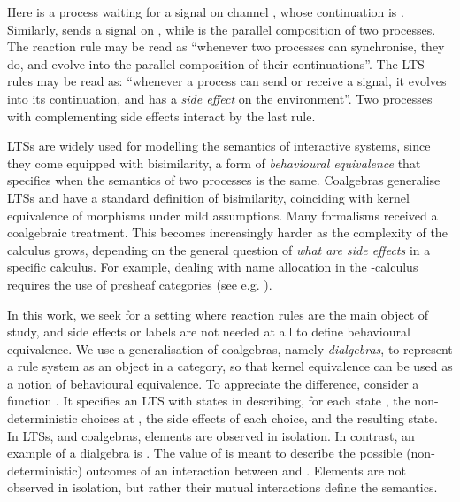 \documentclass[orivec]{llncs}
\begin{document}
Here  is a process waiting for a signal on channel , whose continuation is . Similarly,  sends a signal on , while  is the parallel composition of two processes. The reaction rule may be read as ``whenever two processes can synchronise, they do, and evolve into the parallel composition of their continuations''. The LTS rules may be read as: ``whenever a process can send or receive a signal, it evolves into its continuation, and has a \emph{side effect} on the environment''. Two processes with complementing side effects interact by the last rule. 



LTSs are widely used for modelling the semantics of interactive systems, since they come equipped with bisimilarity, a form of \emph{behavioural equivalence} that specifies when the semantics of two processes is the same. Coalgebras generalise LTSs and have a standard definition of bisimilarity, coinciding with kernel equivalence of morphisms under mild assumptions. Many formalisms received a coalgebraic treatment. This becomes increasingly harder as the complexity of the calculus grows, depending on the general question of \emph{what are side effects} in a specific calculus. For example, dealing with name allocation in the -calculus requires the use of presheaf categories (see e.g. \cite{ft99}). 



In this work, we seek for a setting where reaction rules are the main object of study, and side effects or labels are not needed at all to define behavioural equivalence.
We
use a generalisation of coalgebras, namely \emph{dialgebras}, to represent a rule system as an object in a category, so that kernel equivalence can be used as a notion of behavioural equivalence.
To appreciate the difference, consider a function . It specifies an LTS with states in  describing, for each state , the non-deterministic choices at , the side effects of each choice, and the resulting state. In LTSs, and coalgebras, elements are observed in isolation. In contrast, an example of a dialgebra is . The value of  is meant to describe the possible (non-deterministic) outcomes of an interaction between  and . Elements are not observed in isolation, but rather their mutual interactions define the semantics.
\end{document}
